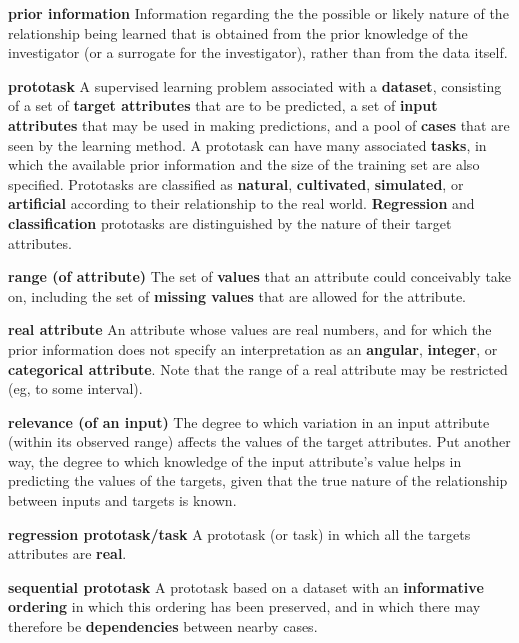 \begin{list}{}{%
\setlength{\itemsep}{0in}%
\setlength{\leftmargin}{2.25in}%
\setlength{\labelsep}{0in}%
\setlength{\labelwidth}{2.25in}}
\item[\bf prior information \hfill]
Information regarding the the possible or likely nature of
the relationship being learned that is obtained from the
prior knowledge of the investigator (or a surrogate for the
investigator), rather than from the data itself.  

\item[\bf prototask \hfill]
A supervised learning problem associated with a {\bf dataset},
consisting of a set of {\bf target attributes} that are to be predicted, 
a set of {\bf input attributes} that may be used in making predictions, 
and a pool of {\bf cases} that are seen by the learning method.  A 
prototask can have many associated {\bf tasks}, in
which the available prior information  and the size of the training set are
also specified.  Prototasks are classified as {\bf natural}, {\bf cultivated}, 
{\bf simulated}, or {\bf artificial} according to their relationship to 
the real world.  {\bf Regression}
and {\bf classification} prototasks are distinguished by the nature of
their target attributes.

\item[\bf range (of attribute)\hfill]
The set of {\bf values} that an attribute could conceivably take on, including
the set of {\bf missing values} that are allowed for the attribute.

\item[\bf real attribute \hfill]
An attribute whose values are real numbers, and for which the prior 
information does not specify an interpretation as an {\bf angular},
{\bf integer}, or {\bf categorical attribute}.  Note that the range of 
a real attribute may be restricted (eg, to some interval).

\item[\bf relevance (of an input) \hfill]
The degree to which variation in an input attribute (within its
observed range) affects the values of the target attributes.
Put another way, the degree to which knowledge of the
input attribute's value helps in predicting the values of the
targets, given that the true nature of the relationship between
inputs and targets is known.

\item[\bf regression prototask/task \hfill]
A prototask (or task) in which all the targets attributes are
{\bf real}.

\item[\bf sequential prototask \hfill]
A prototask based on a dataset with an {\bf informative ordering}
in which this ordering has been preserved, and in which there may
therefore be {\bf dependencies} between nearby cases.


\end{list}
